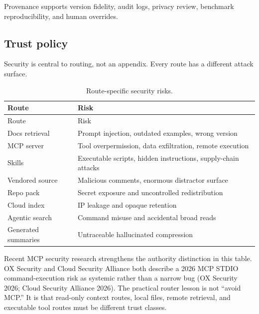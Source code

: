 \documentclass[
  11pt,
  letterpaper,
  numbers=noendperiod,
  parskip=half]{scrartcl}
\begin{document}
Provenance supports version fidelity, audit logs, privacy review,
benchmark reproducibility, and human overrides.

\subsection{Trust policy}\label{sec-security}

Security is central to routing, not an appendix. Every route has a
different attack surface.

\begin{longtable}[]{@{}
  >{\raggedright\arraybackslash}p{}
  >{\raggedright\arraybackslash}p{}@{}}
\caption{Route-specific security
risks.}\label{tbl-security}\tabularnewline
\toprule\noalign{}
\begin{minipage}[b]{\linewidth}\raggedright
Route
\end{minipage} & \begin{minipage}[b]{\linewidth}\raggedright
Risk
\end{minipage} \\
\midrule\noalign{}
\endfirsthead
\toprule\noalign{}
\begin{minipage}[b]{\linewidth}\raggedright
Route
\end{minipage} & \begin{minipage}[b]{\linewidth}\raggedright
Risk
\end{minipage} \\
\midrule\noalign{}
\endhead
\bottomrule\noalign{}
\endlastfoot
Docs retrieval & Prompt injection, outdated examples, wrong version \\
MCP server & Tool overpermission, data exfiltration, remote execution \\
Skills & Executable scripts, hidden instructions, supply-chain
attacks \\
Vendored source & Malicious comments, enormous distractor surface \\
Repo pack & Secret exposure and uncontrolled redistribution \\
Cloud index & IP leakage and opaque retention \\
Agentic search & Command misuse and accidental broad reads \\
Generated summaries & Untraceable hallucinated compression \\
\end{longtable}

Recent MCP security research strengthens the authority distinction in
this table. OX Security and Cloud Security Alliance both describe a
2026 MCP STDIO command-execution risk as systemic rather than a narrow
bug (OX Security 2026; Cloud Security Alliance 2026). The practical
router lesson is not ``avoid MCP.'' It is that read-only context
routes, local files, remote retrieval, and executable tool routes must
be different trust classes.
\end{document}
